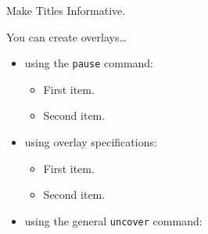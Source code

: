 \documentclass[pdf]{beamer}
\begin{document}
%
%
\begin{frame}{Make Titles Informative.}

  You can create overlays\dots
  \begin{itemize}
  \item using the \texttt{pause} command:
    \begin{itemize}
    \item
      First item.
      \pause
    \item    
       Second item.
    \end{itemize}
  \item
    using overlay specifications:
    \begin{itemize}
    \item<3->
      First item.
    \item<4->
      Second item.
    \end{itemize}
  \item
    using the general \texttt{uncover} command:
    \begin{itemize}
    \end{itemize}
  \end{itemize}
\end{frame}
%
%
%
%
%
%
%
%
\end{document}
